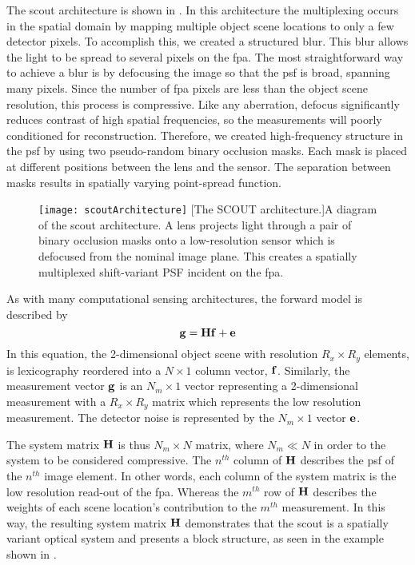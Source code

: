 The \gls{scout} architecture is shown in . In this architecture the \gls{multiplexing} occurs in the spatial domain by mapping multiple object scene locations to only a few detector pixels. To accomplish this, we created a structured blur. This blur allows the light to be spread to several pixels on the \gls{fpa}. The most straightforward way to achieve a blur is by defocusing the image so that the \gls{psf} is broad, spanning many pixels. Since the number of \gls{fpa} pixels are less than the object scene resolution, this process is compressive. Like any aberration, defocus significantly reduces contrast of high spatial frequencies, so the measurements will poorly conditioned for reconstruction. Therefore, we created high-frequency structure in the \gls{psf} by using two pseudo-random binary occlusion masks. Each mask is placed at different positions between the lens and the sensor. The separation between masks results in spatially varying point-spread function. 

\begin{figure}
	\texttt{[image: scoutArchitecture]}
	[The SCOUT architecture.]{A diagram of the \gls{scout} architecture. A lens projects light through a pair of binary occlusion masks onto a low-resolution sensor which is defocused from the nominal image plane. This creates a spatially multiplexed shift-variant PSF incident on the \gls{fpa}.  }
	\label{fig:scoutArchitecture}
\end{figure}

As with many computational sensing architectures, the forward model is described by 
%
\begin{equation}
	\mathbf{g} = \mathbf{H} \mathbf{f} + \mathbf{e}
	\label{eq:scoutgHf}
\end{equation}
%
In this equation, the 2-dimensional object scene with resolution $ R_x \times R_y$ elements, is lexicography reordered into a $N \times 1$ column vector, $\mathbf{f}$. Similarly, the measurement vector $\mathbf{g}$ is an $N_m \times 1$ vector representing a 2-dimensional measurement with a $ R_x \times R_y$ matrix which represents the low resolution measurement. The detector noise is represented by the $ N_m \times 1 $ vector $\mathbf{e}$.

The system matrix $\mathbf{H}$ is thus $N_m \times N $ matrix, where $N_m \ll N$ in order to the system to be considered compressive. The $n^{th}$ column of $\mathbf{H}$ describes the \gls{psf} of the $n^{th}$ image element. In other words, each column of the system matrix is the low resolution read-out of the \gls{fpa}. Whereas the $m^{th}$ row of $\mathbf{H}$ describes the weights of each scene location’s contribution to the $m^{th}$ measurement. In this way, the resulting system matrix $\mathbf{H}$ demonstrates that the \gls{scout} is a spatially variant optical system and presents a block structure, as seen in the example shown in .

